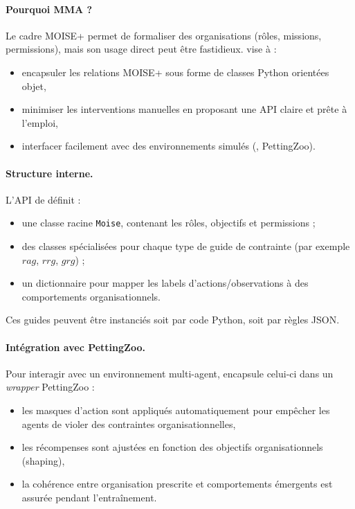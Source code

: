 

\paragraph{Pourquoi MMA ?}
Le cadre MOISE+ permet de formaliser des organisations (rôles, missions, permissions), mais son usage direct peut être fastidieux.  vise à :
\begin{itemize}
  \item encapsuler les relations MOISE+ sous forme de classes Python orientées objet,
  \item minimiser les interventions manuelles en proposant une API claire et prête à l'emploi,
  \item interfacer facilement avec des environnements simulés (, PettingZoo).
\end{itemize}

\paragraph{Structure interne.}
L'API de  définit :
\begin{itemize}
  \item une classe racine \texttt{Moise}, contenant les rôles, objectifs et permissions ;
  \item des classes spécialisées pour chaque type de guide de contrainte (par exemple $rag$, $rrg$, $grg$) ;
  \item un dictionnaire pour mapper les labels d'actions/observations à des comportements organisationnels.
\end{itemize}
Ces guides peuvent être instanciés soit par code Python, soit par règles JSON.

\paragraph{Intégration avec PettingZoo.}
Pour interagir avec un environnement multi-agent,  encapsule celui-ci dans un \textit{wrapper} PettingZoo :
\begin{itemize}
  \item les masques d'action sont appliqués automatiquement pour empêcher les agents de violer des contraintes organisationnelles,
  \item les récompenses sont ajustées en fonction des objectifs organisationnels (shaping),
  \item la cohérence entre organisation prescrite et comportements émergents est assurée pendant l'entraînement.
\end{itemize}

